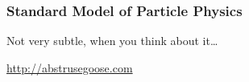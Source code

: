 \begin{frame}
 \frametitle{Standard Model of Particle Physics}
 \begin{block}{Not very subtle, when you think about it\ldots}
  \centerline{}
  \tiny \hfill \url{http://abstrusegoose.com}
 \end{block}
\end{frame}
